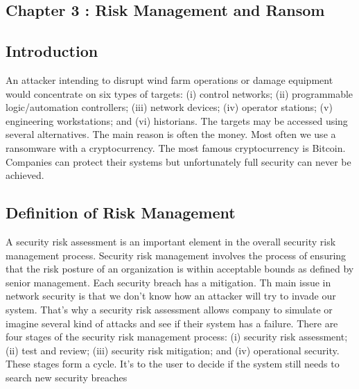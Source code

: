 \documentclass[twosided,a4,10pt]{article}
\begin{document}
\begin{multicols}{2}
\section{Chapter 3 : Risk Management and Ransom } 
\subsection{Introduction}
An attacker intending to disrupt wind farm operations or damage equipment would concentrate on six types of targets: (i) control networks; (ii) programmable logic/automation controllers; (iii) network devices; (iv) operator stations; (v) engineering workstations; and (vi) historians. The targets may be accessed using several alternatives. The main reason is often the money. Most often we use a ransomware with a cryptocurrency. The most famous cryptocurrency is Bitcoin. Companies can protect their systems but unfortunately full security can never be achieved.

\subsection{Definition of Risk Management}
A security risk assessment is an important element in the overall security risk
management process. Security risk management involves the process of ensuring
that the risk posture of an organization is within acceptable bounds as defined by
senior management. Each security breach has a mitigation. Th main issue in network security is that we don't know how an attacker will try to invade our system. That's why a security risk assessment allows company to simulate or imagine several kind of attacks and see if their system has a failure.\newline
There are four stages of the security risk management process:
(i) security risk assessment; (ii) test and review; (iii) security risk mitigation; and (iv) operational security. These stages form a cycle. It's to the user to decide if the system still needs to search new security breaches


\end{multicols}
\end{document}
